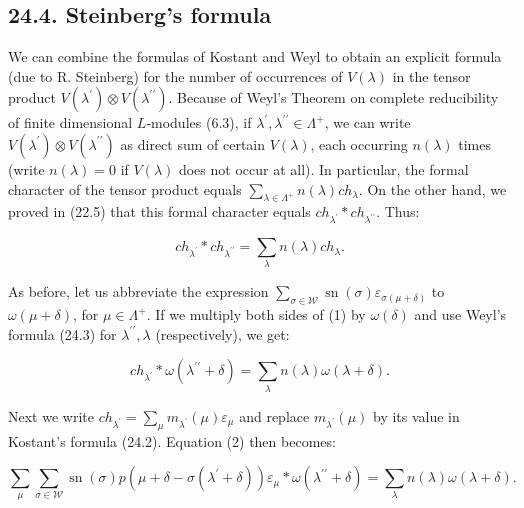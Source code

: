 \documentclass[10pt]{article}
\begin{document}
\subsection*{24.4. Steinberg's formula}
We can combine the formulas of Kostant and Weyl to obtain an explicit formula (due to R. Steinberg) for the number of occurrences of $V(\lambda)$ in the tensor product $V\left(\lambda^{\prime}\right) \otimes V\left(\lambda^{\prime \prime}\right)$. Because of Weyl's Theorem on complete reducibility of finite dimensional $L$-modules (6.3), if $\lambda^{\prime}, \lambda^{\prime \prime} \in \Lambda^{+}$, we can write $V\left(\lambda^{\prime}\right) \otimes V\left(\lambda^{\prime \prime}\right)$ as direct sum of certain $V(\lambda)$, each occurring $n(\lambda)$ times (write $n(\lambda)=0$ if $V(\lambda)$ does not occur at all). In particular, the formal character of the tensor product equals $\sum_{\lambda \in \Lambda^{+}} n(\lambda) c h_{\lambda}$. On the other hand, we proved in (22.5) that this formal character equals $c h_{\lambda^{\prime}} * c h_{\lambda^{\prime \prime}}$. Thus:


\begin{equation*}
c h_{\lambda^{\prime}} * c h_{\lambda^{\prime \prime}}=\sum_{\lambda} n(\lambda) c h_{\lambda} . \tag{1}
\end{equation*}


As before, let us abbreviate the expression $\sum_{\sigma \in \mathscr{W}} \operatorname{sn}(\sigma) \varepsilon_{\sigma(\mu+\delta)}$ to $\omega(\mu+\delta)$, for $\mu \in \Lambda^{+}$. If we multiply both sides of (1) by $\omega(\delta)$ and use Weyl's formula (24.3) for $\lambda^{\prime \prime}, \lambda$ (respectively), we get:


\begin{equation*}
c h_{\lambda^{\prime}} * \omega\left(\lambda^{\prime \prime}+\delta\right)=\sum_{\lambda} n(\lambda) \omega(\lambda+\delta) . \tag{2}
\end{equation*}


Next we write $c h_{\lambda^{\prime}}=\sum_{\mu} m_{\lambda^{\prime}}(\mu) \varepsilon_{\mu}$ and replace $m_{\lambda^{\prime}}(\mu)$ by its value in Kostant's formula (24.2). Equation (2) then becomes:


\begin{equation*}
\sum_{\mu} \sum_{\sigma \in \mathscr{W}} \operatorname{sn}(\sigma) p\left(\mu+\delta-\sigma\left(\lambda^{\prime}+\delta\right)\right) \varepsilon_{\mu} * \omega\left(\lambda^{\prime \prime}+\delta\right)=\sum_{\lambda} n(\lambda) \omega(\lambda+\delta) . \tag{3}
\end{equation*}
\end{document}

